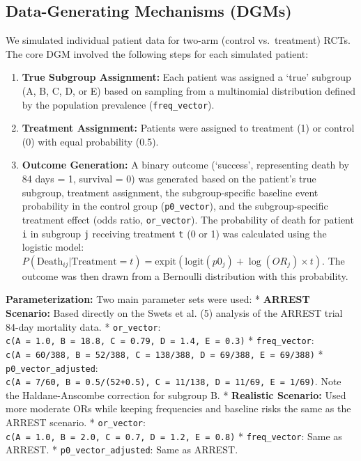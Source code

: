 \documentclass[
  letterpaper,
  DIV=11,
  numbers=noendperiod]{scrartcl}
\providecommand{\tightlist}{%
  \setlength{\itemsep}{0pt}\setlength{\parskip}{0pt}}
\begin{document}
\subsection{Data-Generating Mechanisms
(DGMs)}\label{data-generating-mechanisms-dgms}

We simulated individual patient data for two-arm (control vs.~treatment)
RCTs. The core DGM involved the following steps for each simulated
patient:

\begin{enumerate}
\def\labelenumi{\arabic{enumi}.}
\tightlist
\item
  \textbf{True Subgroup Assignment:} Each patient was assigned a `true'
  subgroup (A, B, C, D, or E) based on sampling from a multinomial
  distribution defined by the population prevalence
  (\texttt{freq\_vector}).
\item
  \textbf{Treatment Assignment:} Patients were assigned to treatment (1)
  or control (0) with equal probability (0.5).
\item
  \textbf{Outcome Generation:} A binary outcome (`success', representing
  death by 84 days = 1, survival = 0) was generated based on the
  patient's true subgroup, treatment assignment, the subgroup-specific
  baseline event probability in the control group (\texttt{p0\_vector}),
  and the subgroup-specific treatment effect (odds ratio,
  \texttt{or\_vector}). The probability of death for patient \texttt{i}
  in subgroup \texttt{j} receiving treatment \texttt{t} (0 or 1) was
  calculated using the logistic model:
  \(P(\text{Death}_{ij} | \text{Treatment}=t) = \text{expit}(\text{logit}(p0_j) + \log(OR_j) \times t)\).
  The outcome was then drawn from a Bernoulli distribution with this
  probability.
\end{enumerate}

\textbf{Parameterization:} Two main parameter sets were used: *
\textbf{ARREST Scenario:} Based directly on the Swets et al. (5)
analysis of the ARREST trial 84-day mortality data. *
\texttt{or\_vector}:
\texttt{c(A\ =\ 1.0,\ B\ =\ 18.8,\ C\ =\ 0.79,\ D\ =\ 1.4,\ E\ =\ 0.3)}
* \texttt{freq\_vector}:
\texttt{c(A\ =\ 60/388,\ B\ =\ 52/388,\ C\ =\ 138/388,\ D\ =\ 69/388,\ E\ =\ 69/388)}
* \texttt{p0\_vector\_adjusted}:
\texttt{c(A\ =\ 7/60,\ B\ =\ 0.5/(52+0.5),\ C\ =\ 11/138,\ D\ =\ 11/69,\ E\ =\ 1/69)}.
Note the Haldane-Anscombe correction for subgroup B. * \textbf{Realistic
Scenario:} Used more moderate ORs while keeping frequencies and baseline
risks the same as the ARREST scenario. * \texttt{or\_vector}:
\texttt{c(A\ =\ 1.0,\ B\ =\ 2.0,\ C\ =\ 0.7,\ D\ =\ 1.2,\ E\ =\ 0.8)} *
\texttt{freq\_vector}: Same as ARREST. * \texttt{p0\_vector\_adjusted}:
Same as ARREST.
\end{document}

